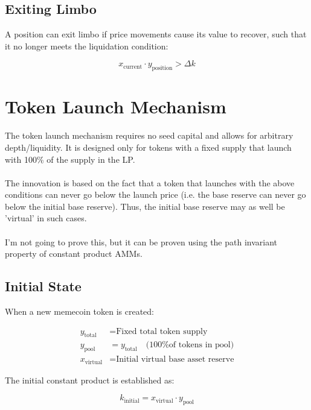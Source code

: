 \documentclass[11pt]{article}
\begin{document}
\subsection{Exiting Limbo}

A position can exit limbo if price movements cause its value to recover, such that it no longer meets the liquidation condition:

\begin{equation}
x_{\text{current}} \cdot y_{\text{position}} > \Delta k
\end{equation}

\section{Token Launch Mechanism}

The token launch mechanism requires no seed capital and allows for arbitrary depth/liquidity. It is designed only for tokens with a fixed supply that launch with 100\% of the supply in the LP.
\\\\The innovation is based on the fact that a token that launches with the above conditions can never go below the launch price (i.e. the base reserve can never go below the initial base reserve). Thus, the initial base reserve may as well be 'virtual' in such cases.
\\\\I'm not going to prove this, but it can be proven using the path invariant property of constant product AMMs.
        

\subsection{Initial State}
When a new memecoin token is created:

\begin{equation}
\begin{aligned}
y_{\text{total}} &= \text{Fixed total token supply} \\
y_{\text{pool}} &= y_{\text{total}} \quad \text{(100\% of tokens in pool)} \\
x_{\text{virtual}} &= \text{Initial virtual base asset reserve}
\end{aligned}
\end{equation}

The initial constant product is established as:

\begin{equation}
k_{\text{initial}} = x_{\text{virtual}} \cdot y_{\text{pool}}
\end{equation}
\end{document}
